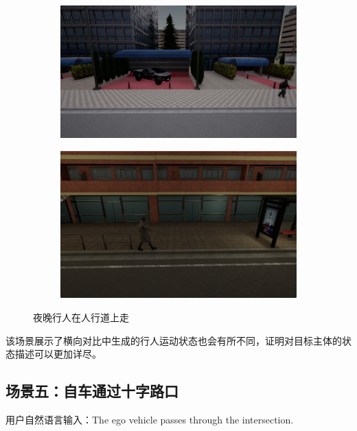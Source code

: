 \begin{figure}[H]
	\centering
	\begin{subfigure}[t]{0.48\textwidth}
		\centering
		\includegraphics[width=\textwidth]{images/场景9.pdf}
		\caption{}
		\label{fig:night_sidewalk_1}
	\end{subfigure}
	\hfill %
	\begin{subfigure}[t]{0.48\textwidth}
		\centering
		\includegraphics[width=\textwidth]{images/场景9.1.png}
		\caption{}
		\label{fig:night_sidewalk_2}
	\end{subfigure}
	\caption{夜晚行人在人行道上走}
	\label{fig:night_sidewalk}
\end{figure}
该场景展示了横向对比中生成的行人运动状态也会有所不同，证明对目标主体的状态描述可以更加详尽。
\subsection{场景五：自车通过十字路口}
用户自然语言输入：\index The ego vehicle passes through the intersection.\\


